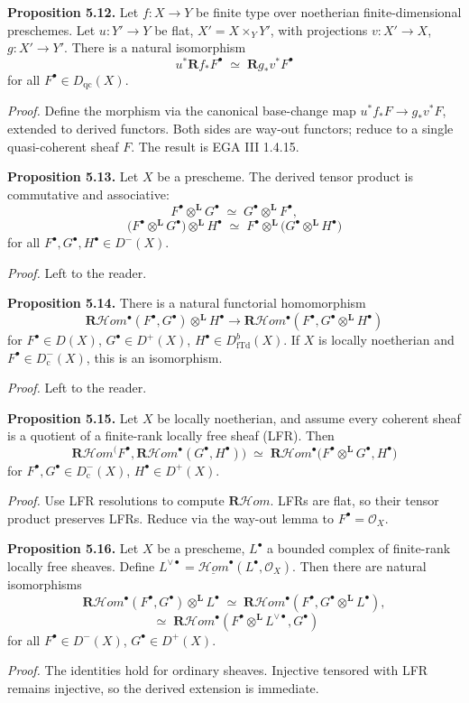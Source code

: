 \textbf{Proposition 5.12.}
Let $f\colon X\to Y$ be finite type over noetherian finite-dimensional preschemes.
Let $u\colon Y'\to Y$ be flat, $X'=X\times_Y Y'$, with projections $v\colon X'\to X$, $g\colon X'\to Y'$.
There is a natural isomorphism
\[
u^*\mathbf{R}f_*F^\bullet
\;\simeq\;
\mathbf{R}g_*v^*F^\bullet
\]
for all $F^\bullet\in D_{\mathrm{qc}}(X)$.

\setcounter{page}{112}
\textit{Proof.}
Define the morphism via the canonical base-change map $u^*f_*F\to g_*v^*F$, extended to derived functors.
Both sides are way-out functors; reduce to a single quasi-coherent sheaf $F$. The result is EGA III 1.4.15.

\textbf{Proposition 5.13.}
Let $X$ be a prescheme. The derived tensor product is commutative and associative:
\[
F^\bullet\otimes^{\mathbf{L}}G^\bullet \;\simeq\; G^\bullet\otimes^{\mathbf{L}}F^\bullet,
\]
\[
\big(F^\bullet\otimes^{\mathbf{L}}G^\bullet\big)\otimes^{\mathbf{L}}H^\bullet
\;\simeq\;
F^\bullet\otimes^{\mathbf{L}}\big(G^\bullet\otimes^{\mathbf{L}}H^\bullet\big)
\]
for all $F^\bullet,G^\bullet,H^\bullet\in D^-(X)$.

\textit{Proof.} Left to the reader.

\setcounter{page}{113}
\textbf{Proposition 5.14.}
There is a natural functorial homomorphism
\[
\mathbf{R}\mathcal{H}\textit{om}^\bullet(F^\bullet,G^\bullet)\otimes^{\mathbf{L}}H^\bullet
\to
\mathbf{R}\mathcal{H}\textit{om}^\bullet(F^\bullet,G^\bullet\otimes^{\mathbf{L}}H^\bullet)
\]
for $F^\bullet\in D(X)$, $G^\bullet\in D^+(X)$, $H^\bullet\in D^b_{\mathrm{fTd}}(X)$.
If $X$ is locally noetherian and $F^\bullet\in D_{\mathrm{c}}^-(X)$, this is an isomorphism.

\textit{Proof.} Left to the reader.

\textbf{Proposition 5.15.}
Let $X$ be locally noetherian, and assume every coherent sheaf is a quotient of a finite-rank locally free sheaf (LFR). Then
\[
\mathbf{R}\mathcal{H}\textit{om}^\big(F^\bullet,\mathbf{R}\mathcal{H}\textit{om}^\bullet(G^\bullet,H^\bullet)\big)
\;\simeq\;
\mathbf{R}\mathcal{H}\textit{om}^\bullet\big(F^\bullet\otimes^{\mathbf{L}}G^\bullet,H^\bullet\big)
\]
for $F^\bullet,G^\bullet\in D_{\mathrm{c}}^-(X)$, $H^\bullet\in D^+(X)$.

\textit{Proof.}
Use LFR resolutions to compute $\mathbf{R}\mathcal{H}\textit{om}$. LFRs are flat, so their tensor product preserves LFRs. Reduce via the way-out lemma to $F^\bullet=\mathcal{O}_X$.

\setcounter{page}{114}
\textbf{Proposition 5.16.}
Let $X$ be a prescheme, $L^\bullet$ a bounded complex of finite-rank locally free sheaves. Define $L^{\vee\bullet}=\underline{\mathcal{H}\textit{om}}^\bullet(L^\bullet,\mathcal{O}_X)$. Then there are natural isomorphisms
\[
\mathbf{R}\mathcal{H}\textit{om}^\bullet(F^\bullet,G^\bullet)\otimes^{\mathbf{L}}L^\bullet
\;\simeq\;
\mathbf{R}\mathcal{H}\textit{om}^\bullet(F^\bullet,G^\bullet\otimes^{\mathbf{L}}L^\bullet),
\]
\[
\;\simeq\;
\mathbf{R}\mathcal{H}\textit{om}^\bullet(F^\bullet\otimes^{\mathbf{L}}L^{\vee\bullet},G^\bullet)
\]
for all $F^\bullet\in D^-(X)$, $G^\bullet\in D^+(X)$.

\textit{Proof.}
The identities hold for ordinary sheaves. Injective tensored with LFR remains injective, so the derived extension is immediate.